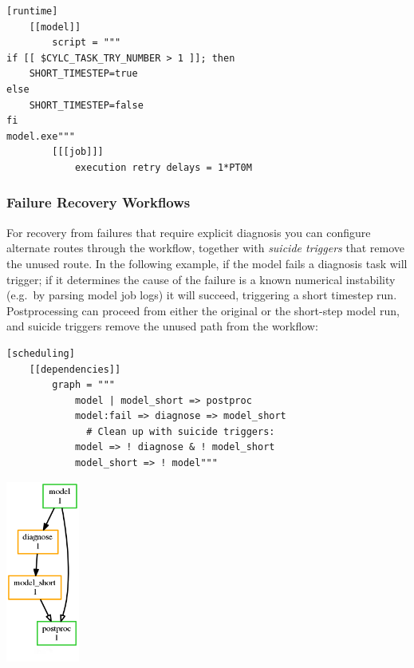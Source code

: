 \lstset{language=suiterc}
\begin{lstlisting}
[runtime]
    [[model]]
        script = """
if [[ $CYLC_TASK_TRY_NUMBER > 1 ]]; then
    SHORT_TIMESTEP=true
else
    SHORT_TIMESTEP=false
fi
model.exe"""
        [[[job]]]
            execution retry delays = 1*PT0M
\end{lstlisting}

\subsubsection{Failure Recovery Workflows}

For recovery from failures that require explicit diagnosis you can configure
alternate routes through the workflow, together with {\em suicide triggers}
that remove the unused route. In the following example, if the model fails a
diagnosis task will trigger; if it determines the cause of the failure is a
known numerical instability (e.g.\ by parsing model job logs) it will succeed,
triggering a short timestep run. Postprocessing can proceed from either the
original or the short-step model run, and suicide triggers remove the unused
path from the workflow:

\lstset{language=suiterc}
\begin{lstlisting}
[scheduling]
    [[dependencies]]
        graph = """
            model | model_short => postproc
            model:fail => diagnose => model_short
              # Clean up with suicide triggers:
            model => ! diagnose & ! model_short
            model_short => ! model"""
\end{lstlisting}
  \includegraphics[width=0.18\textwidth]{resources/png/failure-recovery.png}

